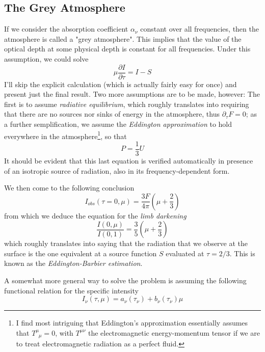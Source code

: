 \subsection*{The Grey Atmosphere}
If we consider the absorption coefficient $\alpha_{\nu}$ constant over all frequencies, then the atmosphere is called a "grey atmosphere". This implies that the value of the optical depth at some physical depth is constant for all frequencies. Under this assumption, we could solve 
\begin{equation*}
	\mu \frac{\partial I}{\partial\tau} = I-S
\end{equation*}
I'll skip the explicit calculation (which is actually fairly easy for once) and present just the final result. Two more assumptions are to be made, however: The first is to assume \emph{radiative equilibrium}, which roughly translates into requiring that there are no sources nor sinks of energy in the atmosphere, thus $\partial_{\tau} F = 0$; as a further semplification, we assume the \emph{Eddington approximation} to hold everywhere in the atmosphere\footnote{I find most intriguing that Eddington's approximation essentially assumes that $T^{\mu}_{\;\;\mu} = 0$, with $T^{\mu\nu}$ the electromagnetic energy-momentum tensor if we are to treat electromagnetic radiation as a perfect fluid.}, so that 
\begin{equation*}
	P = \frac{1}{3}U
\end{equation*}
It should be evident that this last equation is verified automatically in presence of an isotropic source of radiation, also in its frequency-dependent form.
\par We then come to the following conclusion 
\begin{equation}
	I_{obs}(\tau = 0,\mu) = \frac{3F}{4\pi}\left(\mu+\frac{2}{3}\right)
\end{equation}
from which we deduce the equation for the \emph{limb darkening}
\begin{equation*}
	\frac{I(0,\mu)}{I(0,1)} = \frac{3}{5}\left(\mu+\frac{2}{3}\right)
\end{equation*}
which roughly translates into saying that the radiation that we observe at the surface is the one equivalent at a source function $S$ evaluated at $\tau = 2/3$. This is known as the \emph{Eddington-Barbier estimation}.
\par A somewhat more general way to solve the problem is assuming the following functional relation for the specific intensity 
\begin{equation*}
	I_{\nu}(\tau,\mu) = a_{\nu}(\tau_{\nu})+b_{\nu}(\tau_{\nu})\mu
\end{equation*}
